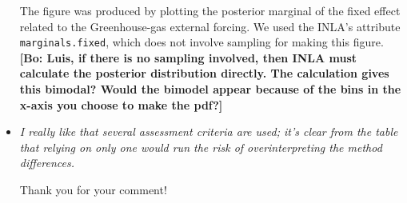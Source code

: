 \documentclass[11pt]{article}
\newcommand{\bl}[1]{\color{red}\textbf{[Bo: #1]}\normalcolor}
\begin{document}
\begin{itemize}
The figure was produced by plotting the posterior marginal of the fixed effect
related to the Greenhouse-gas external forcing. We used the INLA's attribute
\verb|marginals.fixed|, which does not involve sampling for making 
this figure.
\bl{Luis, if there is no sampling involved, then INLA must calculate the posterior distribution directly. The calculation gives this bimodal? Would the bimodel appear because of the bins in the x-axis you choose to make the pdf?}


\item \textit{I really like that several assessment criteria are used; it's clear
  from the table that relying on only one would run the risk of
  overinterpreting the method differences.}

Thank you for your comment!

\end{itemize}
\end{document}
